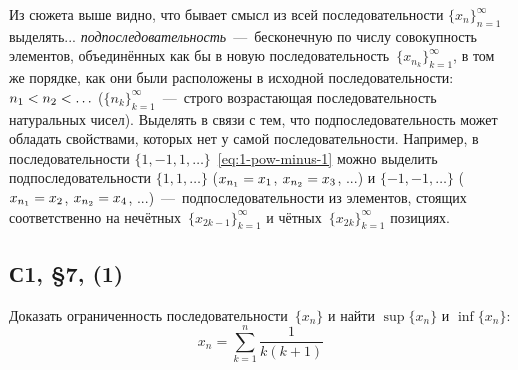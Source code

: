 \documentclass[a4paper,12pt]{article}
\begin{document}
  Из сюжета выше видно, что бывает смысл из всей последовательности $\{x_n\}_{n = 1}^{\infty}$ выделять... \emph{подпоследовательность}~---~бесконечную по числу совокупность элементов, объединённых как бы в новую последовательность~$\{x_{n_k}\}_{k = 1}^{\infty}$, в том же порядке, как они были расположены в исходной последовательности: $n_1 \hm< n_2 \hm< \ldots$ ($\{n_k\}_{k = 1}^{\infty}$~---~строго возрастающая последовательность натуральных чисел).
  Выделять в связи с тем, что подпоследовательность может обладать свойствами, которых нет у самой последовательности.
  Например, в последовательности $\{1, -1, 1, \ldots\}$~\eqref{eq:1-pow-minus-1} можно выделить подпоследовательности $\{1, 1, \ldots\}$ ($x_{n_1} \hm= x_1$, $x_{n_2} \hm= x_3$, ...) и $\{-1, -1, \ldots\}$ ($x_{n_1} \hm= x_2$, $x_{n_2} \hm= x_4$, ...)~---~подпоследовательности из элементов, стоящих соответственно на нечётных~$\{x_{2k - 1}\}_{k = 1}^{\infty}$ и чётных~$\{x_{2k}\}_{k = 1}^{\infty}$ позициях.
  


  \subsection{С1, \S 7, (1)}
  
  Доказать ограниченность последовательности~$\{x_n\}$ и найти $\sup\{x_n\}$ и $\inf\{x_n\}$:
  \[
    x_n = \sum_{k = 1}^n\frac{1}{k(k + 1)}
  \]
  
\end{document}
